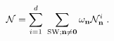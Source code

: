 \begin{equation}\label{calno}
{\cal N} = \sum_{i = 1}^d \; \sum_{{\rm SW}; {\bf n} 
\ne {\bf 0}} \omega_{{\bf n}} {\cal N}_{{\bf n}}^i \; . 
\end{equation} 
